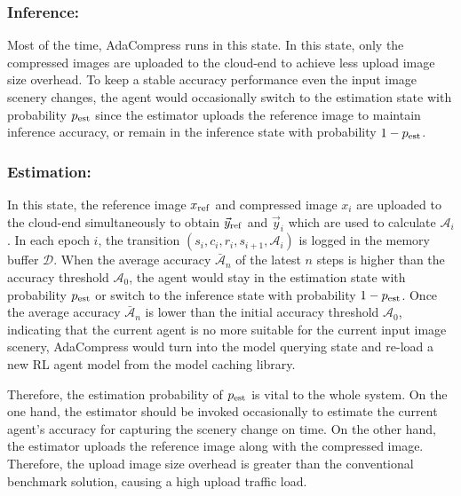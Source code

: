 \subsubsection{Inference:}

Most of the time, AdaCompress runs in this state. In this state, only the compressed images are uploaded to the cloud-end to achieve less upload image size overhead. To keep a stable accuracy performance even the input image scenery changes, the agent would occasionally switch to the estimation state with probability $ p_{\rm est} $ since the estimator uploads the reference image to maintain inference accuracy, or remain in the inference state with probability $ 1 - p_{\rm est} $. %

\subsubsection{Estimation:}

In this state, the reference image $ x_{\rm ref} $ and compressed image $ x_i $ are uploaded to the cloud-end simultaneously to obtain $ \vec{y}_{\rm ref} $ and $ \vec{y}_i $ which are used to calculate $ \mathcal{A}_i $. In each epoch $ i $, the transition {\color{revise2}$ (s_i, c_i, r_i, s_{i+1},\mathcal{A}_i ) $} is logged in the memory buffer $ \mathcal{D} $. When the average accuracy $ \bar{\mathcal{A}}_n $ of the latest $ n $ steps is higher than the accuracy threshold $ \mathcal{A}_0 $, the agent would stay in the estimation state with probability $ p_{\rm est} $ or switch to the inference state with probability $ 1 - p_{\rm est} $. Once the average accuracy $ \bar{\mathcal{A}}_n $ is lower than the initial accuracy threshold $ \mathcal{A}_0 $, indicating that the current agent is no more suitable for the current input image scenery, AdaCompress would turn into the model querying state and re-load a new RL agent model from the model caching library. %

Therefore, the estimation probability of $ p_{\rm est} $ is vital to the whole system. On the one hand, the estimator should be invoked occasionally to estimate the current agent's accuracy for capturing the scenery change on time. On the other hand, the estimator uploads the reference image along with the compressed image. Therefore, the upload image size overhead is greater than the conventional benchmark solution, causing a high upload traffic load. %

